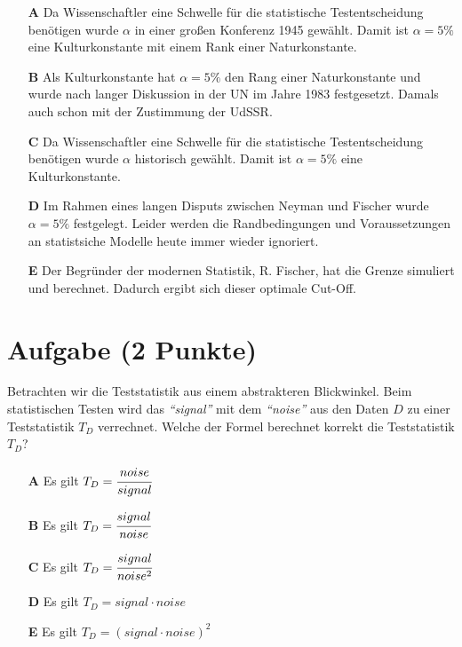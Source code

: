 \documentclass[a4paper, 9pt]{scrartcl}\usepackage[]{graphicx}\usepackage[]{xcolor}
\begin{document}
\begin{enumerate}
\item [\textbf{A} \msquare] Da Wissenschaftler eine Schwelle für die statistische Testentscheidung benötigen wurde $\alpha$ in einer großen Konferenz 1945 gewählt. Damit ist $\alpha = 5\%$ eine Kulturkonstante mit einem Rank einer Naturkonstante.
\item [\textbf{B} \msquare] Als Kulturkonstante hat $\alpha = 5\%$ den Rang einer Naturkonstante und wurde nach langer Diskussion in der UN im Jahre 1983 festgesetzt. Damals auch schon mit der Zustimmung der UdSSR.
\item [\textbf{C} \msquare] Da Wissenschaftler eine Schwelle für die statistische Testentscheidung benötigen wurde $\alpha$ historisch gewählt. Damit ist $\alpha = 5\%$ eine Kulturkonstante.
\item [\textbf{D} \msquare] Im Rahmen eines langen Disputs zwischen Neyman und Fischer wurde $\alpha = 5\%$ festgelegt. Leider werden die Randbedingungen und Voraussetzungen an statistsiche Modelle heute immer wieder ignoriert.
\item [\textbf{E} \msquare] Der Begründer der modernen Statistik, R. Fischer, hat die Grenze simuliert und berechnet. Dadurch ergibt sich dieser optimale Cut-Off.
\end{enumerate}

\section{Aufgabe \hfill (2 Punkte)}

Betrachten wir die Teststatistik aus einem abstrakteren Blickwinkel. Beim
statistischen Testen wird das \textit{"`signal"'} mit dem
\textit{"`noise"'} aus den Daten $D$ zu einer Teststatistik $T_D$ verrechnet. Welche der Formel
berechnet korrekt die Teststatistik $T_D$?



\begin{enumerate}
\item [\textbf{A} \msquare] Es gilt $T_D = \cfrac{noise}{signal}$
\item [\textbf{B} \msquare] Es gilt $T_D = \cfrac{signal}{noise}$
\item [\textbf{C} \msquare] Es gilt $T_D = \cfrac{signal}{noise^2}$
\item [\textbf{D} \msquare] Es gilt $T_D = signal \cdot noise$
\item [\textbf{E} \msquare] Es gilt $T_D = (signal \cdot noise)^2$
\end{enumerate}
\end{document}
